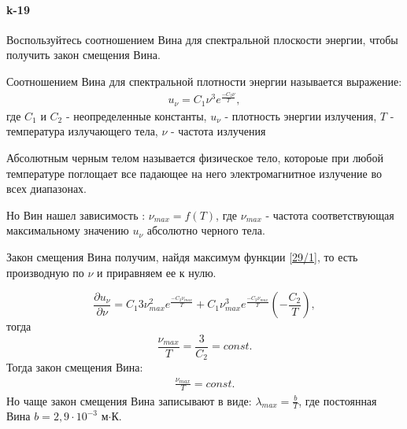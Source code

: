 


\paragraph{k-19}
Воспользуйтесь соотношением Вина для спектральной плоскости энергии, чтобы получить закон смещения Вина.
\begin{definition}
	Соотношением Вина для спектральной плотности энергии называется выражение: 
	\begin{gather}
	\label{29/1}
          u_{\nu}=C_{1}\nu^{3}e^{\frac{-C_{2}\nu}{T}},
	\end{gather}
где $C_{1}$ и $C_{2}$ - неопределенные константы, $u_{\nu}$ - плотность энергии излучения, $T$ - температура излучающего тела, $\nu$ - частота излучения
\end{definition}

\begin{definition}
	Абсолютным черным телом называется физическое тело, котороые при любой температуре поглощает все падающее на него электромагнитное излучение во всех диапазонах.
\end{definition}
Но Вин нашел зависимость : $\nu_{max} = f(T)$, где $\nu_{max}$ - частота соответствующая максимальному значению $u_{\nu}$ абсолютно черного тела.

Закон смещения Вина получим, найдя максимум функции \ref{29/1}, то есть производную по $\nu$ и приравняем ее к нулю.

$$
   \frac {\partial u_{\nu}}{\partial \nu}= C_{1}3\nu_{max}^{2}e^{\frac{-C_{2}\nu_{max}}{T}}+
   C_{1}\nu_{max}^{3}e^{\frac{-C_{2}\nu_{max}}{T}}(-\frac{C_{2}}{T}),
$$
тогда
$$
    \frac{\nu_{max}}{T}=\frac{3}{C_{2}}=const.
$$
Тогда закон смещения Вина:
\begin{gather}
\label{goof}
            \frac{\nu_{max}}{T}=const.
\end{gather}
Но чаще закон смещения Вина записывают в виде: $\lambda_{max}=\frac{b}{T}$, где постоянная Вина $b=2,9\cdot10^{-3}$ м$\cdot$К. 

